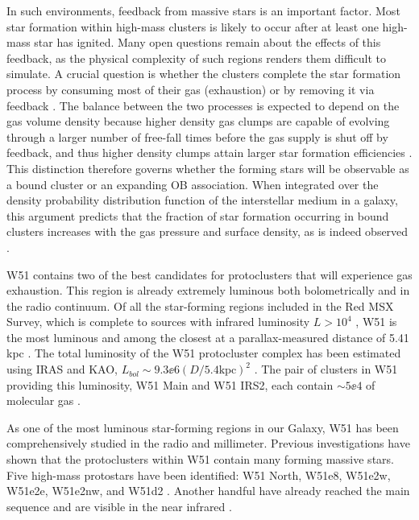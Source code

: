 In such environments, feedback from massive stars is an important factor.  Most star
formation within high-mass clusters is likely to occur after at least one
high-mass star has ignited.  Many open questions remain about the effects of
this feedback, as the physical complexity of such regions renders them
difficult to simulate.  A crucial question is whether the clusters complete the
star formation process by consuming most of their gas (exhaustion) or
by removing it via feedback 
\citep[expulsion;][]{Kruijssen2012b,Longmore2014a,Matzner2015a}.
The balance between the two processes is expected to depend on the gas volume
density because higher density gas clumps are capable of evolving through a
larger number of free-fall times before the gas supply is shut off by feedback,
and thus higher density clumps attain larger star formation efficiencies
\citep{Kruijssen2012a}.
This distinction therefore governs whether the forming stars will be observable as a
bound cluster or an expanding OB association.
When integrated over the density probability distribution function of the
interstellar medium in a galaxy, this argument predicts that the fraction of
star formation occurring in bound clusters increases with the gas pressure and
surface density, as is indeed observed \citep{Goddard2010a,Kruijssen2012a,Adamo2015a}.


W51 contains two of the best candidates for protoclusters that will experience
gas exhaustion.  This region is already extremely luminous both bolometrically
and in the radio continuum.  Of all the star-forming regions included in the
Red MSX Survey, which is complete to sources with infrared luminosity $L>10^4$
\lsun, W51 is the most luminous \citep{Urquhart2014a} and among the closest at
a parallax-measured distance of 5.41 kpc \citep{Sato2010a,Xu2009a}.  The total
luminosity of the W51 protocluster complex has been estimated using IRAS and
KAO, $L_{bol}\sim9.3\ee{6} (D/5.4\mathrm{kpc})^2$ \lsun
\citep{Harvey1986a,Sievers1991a}.  The pair of clusters in W51 providing this
luminosity, W51 Main and W51 IRS2, each contain $\sim5\ee{4}$ \msun of
molecular gas \citep{Ginsburg2012a}.

As one of the most luminous star-forming regions in our Galaxy, W51 has been
comprehensively studied in the radio and millimeter.  
Previous investigations have shown that the protoclusters within W51 contain many
forming massive stars. Five high-mass protostars have been identified:
W51 North, W51e8, W51e2w, W51e2e, W51e2nw, and W51d2
\citep{Zhang1997a,Keto2008b,Zapata2008a,Zapata2009a,Zapata2010a,Shi2010b,Shi2010a,Surcis2012a,Goddi2015a,Goddi2016a}.
Another handful have already reached the main sequence and are visible in the
near infrared
\citep{Goldader1994a,Okumura2000a,Kumar2004a,Barbosa2008a,Figueredo2008a}.

